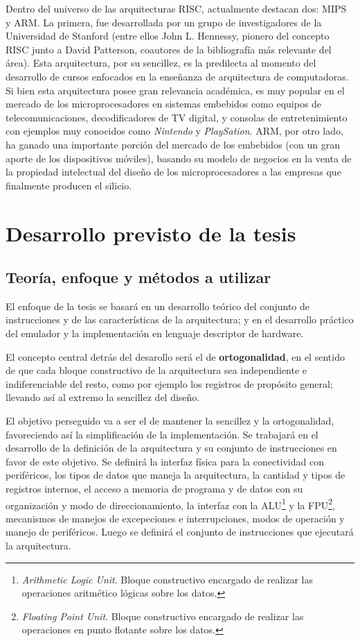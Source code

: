 \documentclass[a4paper]{article}
\begin{document}
Dentro del universo de las arquitecturas RISC, actualmente destacan dos: MIPS y ARM. La primera, fue desarrollada por un grupo de investigadores de la Universidad de Stanford (entre ellos John L. Hennessy, pionero del concepto RISC junto a David Patterson, coautores de la bibliografía más relevante del área). Esta arquitectura, por su sencillez, es la predilecta al momento del desarrollo de cursos enfocados en la enseñanza de arquitectura de computadoras. Si bien esta arquitectura posee gran relevancia académica, es muy popular en el mercado de los microprocesadores en sistemas embebidos como equipos de telecomunicaciones, decodificadores de TV digital, y consolas de entretenimiento con ejemplos muy conocidos como \emph{Nintendo} y \emph{PlaySation}. ARM, por otro lado, ha ganado una importante porción del mercado de los embebidos (con un gran aporte de los dispositivos móviles), basando su modelo de negocios en la venta de la propiedad intelectual del diseño de los microprocesadores a las empresas que finalmente producen el silicio.

\section{Desarrollo previsto de la tesis}

\subsection{Teoría, enfoque y métodos a utilizar}

El enfoque de la tesis se basará en un desarrollo teórico del conjunto de instrucciones y de las características de la arquitectura; y en el desarrollo
práctico del emulador y la implementación en lenguaje descriptor de hardware.

El concepto central detrás del desarollo será el de \textbf{ortogonalidad}, en el sentido de que cada bloque constructivo de la arquitectura sea independiente e indiferenciable del resto, como por ejemplo los registros de propósito general; llevando así al extremo la sencillez del diseño.

El objetivo perseguido va a ser el de mantener la sencillez y la ortogonalidad, favoreciendo así la simplificación de la implementación. Se trabajará en el desarrollo de la definición de la arquitectura y su conjunto de instrucciones en favor de este objetivo. Se definirá la interfaz física para la conectividad con periféricos, los tipos de datos que maneja la arquitectura, la cantidad y tipos de registros internos, el acceso a memoria de programa y de datos con su organización y modo de direccionamiento, la interfaz con la ALU\footnote{\label{ALU} \emph{Arithmetic Logic Unit}. Bloque constructivo encargado de realizar las operaciones aritmético lógicas sobre los datos.} y la FPU\footnote{\label{FPU} \emph{Floating Point Unit}. Bloque constructivo encargado de realizar las operaciones en punto flotante sobre los datos.}, mecanismos de manejos de excepeciones e interrupciones, modos de operación y manejo de periféricos. Luego se definirá el conjunto de instrucciones que ejecutará la arquitectura.
\end{document}
